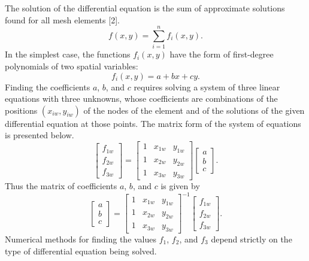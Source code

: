 \documentclass[12pt,a4paper]{article}
\begin{document}
The solution of the differential equation is the sum of approximate solutions found for all mesh
elements [2].
\begin{equation}
f(x,y)=\sum_{i=1}^{n}f_i(x,y). \tag{2.11}
\end{equation}
In the simplest case, the functions $f_i(x,y)$ have the form of first-degree polynomials of two
spatial variables:
\begin{equation}
f_i(x,y)=a+bx+cy. \tag{2.12}
\end{equation}
Finding the coefficients $a$, $b$, and $c$ requires solving a system of three linear equations with
three unknowns, whose coefficients are combinations of the positions $(x_{iw},y_{iw})$ of the nodes
of the element and of the solutions of the given differential equation at those points. The matrix form
of the system of equations is presented below.
\begin{equation}
\begin{bmatrix}
f_{1w}\\ f_{2w}\\ f_{3w}
\end{bmatrix}
=
\begin{bmatrix}
1&x_{1w}&y_{1w}\\
1&x_{2w}&y_{2w}\\
1&x_{3w}&y_{3w}
\end{bmatrix}
\begin{bmatrix}
a\\ b\\ c
\end{bmatrix}. \tag{2.13}
\end{equation}
Thus the matrix of coefficients $a$, $b$, and $c$ is given by
\begin{equation}
\begin{bmatrix}
a\\ b\\ c
\end{bmatrix}
=
\begin{bmatrix}
1&x_{1w}&y_{1w}\\
1&x_{2w}&y_{2w}\\
1&x_{3w}&y_{3w}
\end{bmatrix}^{-1}
\begin{bmatrix}
f_{1w}\\ f_{2w}\\ f_{3w}
\end{bmatrix}. \tag{2.14}
\end{equation}
Numerical methods for finding the values $f_1$, $f_2$, and $f_3$ depend strictly on the type of
differential equation being solved.
\end{document}
